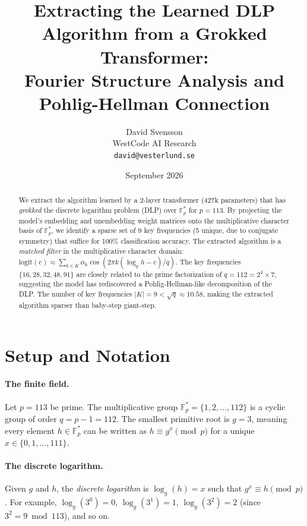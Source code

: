 \documentclass[11pt]{article}
\title{Extracting the Learned DLP Algorithm from a Grokked Transformer: \\
Fourier Structure Analysis and Pohlig-Hellman Connection}
\author{David Svensson \\ WestCode AI Research \\ \texttt{david@vesterlund.se}}
\date{September 2026}
\newcommand{\Fps}{\mathbb{F}_p^*}
\newcommand{\logg}{\log_g}
\begin{document}
\maketitle

\begin{abstract}
We extract the algorithm learned by a 2-layer transformer (427k parameters) that has \emph{grokked} the discrete logarithm problem (DLP) over $\Fps$ for $p = 113$. By projecting the model's embedding and unembedding weight matrices onto the multiplicative character basis of $\Fps$, we identify a sparse set of 9 key frequencies (5 unique, due to conjugate symmetry) that suffice for 100\% classification accuracy. The extracted algorithm is a \emph{matched filter} in the multiplicative character domain: $\text{logit}(c) \approx \sum_{k \in K} \alpha_k \cos(2\pi k (\log_g h - c) / q)$. The key frequencies $\{16, 28, 32, 48, 91\}$ are closely related to the prime factorization of $q = 112 = 2^4 \times 7$, suggesting the model has rediscovered a Pohlig-Hellman-like decomposition of the DLP. The number of key frequencies $|K| = 9 < \sqrt{q} \approx 10.58$, making the extracted algorithm sparser than baby-step giant-step.
\end{abstract}


\section{Setup and Notation}

\paragraph{The finite field.}
Let $p = 113$ be prime. The multiplicative group $\Fps = \{1, 2, \ldots, 112\}$ is a cyclic group of order $q = p - 1 = 112$. The smallest primitive root is $g = 3$, meaning every element $h \in \Fps$ can be written as $h \equiv g^x \pmod{p}$ for a unique $x \in \{0, 1, \ldots, 111\}$.

\paragraph{The discrete logarithm.}
Given $g$ and $h$, the \emph{discrete logarithm} is $\logg(h) = x$ such that $g^x \equiv h \pmod{p}$. For example, $\logg(3^0) = 0$, $\logg(3^1) = 1$, $\logg(3^2) = 2$ (since $3^2 = 9 \bmod 113$), and so on.
\end{document}
